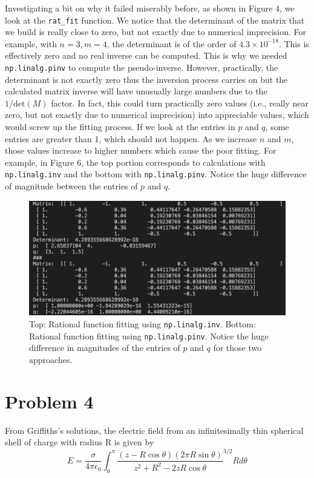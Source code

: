 \documentclass{article}
\begin{document}
Investigating a bit on why it failed miserably before, as shown in Figure 4, we look at the \verb|rat_fit| function. We notice that the determinant of the matrix that we build is really close to zero, but not exactly due to numerical imprecision. For example, with $n=3, m = 4$, the determinant is of the order of $4.3 \times 10^{-18}$. This is effectively zero and no real inverse can be computed. This is why we needed \verb|np.linalg.pinv| to compute the pseudo-inverse. However, practically, the determinant is not exactly zero thus the inversion process carries on but the calculated matrix inverse will have unusually large numbers due to the $1/\text{det}(M)$ factor. In fact, this could turn practically zero values (i.e., really near zero, but not exactly due to numerical imprecision) into appreciable values, which would screw up the fitting process. If we look at the entries in $p$ and $q$, some entries are greater than 1, which should not happen. As we increase $n$ and $m$, those values increase to higher numbers which cause the poor fitting. For example, in Figure 6, the top portion corresponds to calculations with \verb|np.linalg.inv| and the bottom with \verb|np.linalg.pinv|. Notice the huge difference of magnitude between the entries of $p$ and $q$.
\begin{figure}[h]
    \centering
    \includegraphics[scale=0.5]{images/prob3_pq_explanation.png}
    \cprotect\caption{Top: Rational function fitting using \verb|np.linalg.inv|. Bottom: Rational function fitting using \verb|np.linalg.pinv|. Notice the huge difference in magnitudes of the entries of $p$ and $q$ for those two approaches.}
\end{figure}

\newpage
\section*{Problem 4}
From Griffiths's solutions, the electric field from an infinitesimally thin spherical shell of charge with radius R is given by
\begin{equation}
    E = \frac{\sigma}{4 \pi \epsilon_0} \int_0^\pi \frac{(z - R \cos \theta)(2 \pi R \sin \theta)}{z^2 + R^2 - 2 z R \cos \theta}^{3/2} R d\theta
\end{equation}
\end{document}
